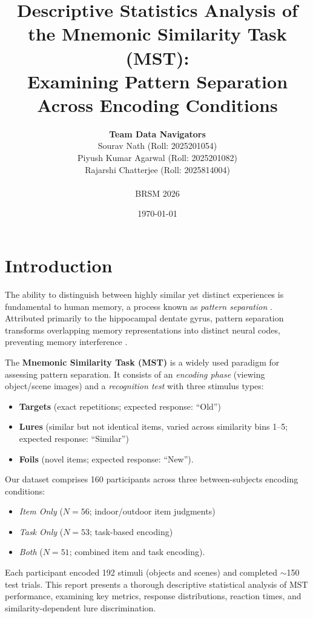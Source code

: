 \documentclass[12pt]{article}
\title{\textbf{Descriptive Statistics Analysis of the Mnemonic Similarity Task (MST):\\Examining Pattern Separation Across Encoding Conditions}}
\author{\textbf{Team Data Navigators} \\
Sourav Nath (Roll: 2025201054) \\
Piyush Kumar Agarwal (Roll: 2025201082) \\
Rajarshi Chatterjee (Roll: 2025814004) \\\\
BRSM 2026}
\date{\today}
\begin{document}
\maketitle

\section{Introduction}

The ability to distinguish between highly similar yet distinct experiences is fundamental to human memory, a process known as \textit{pattern separation} \citep{yassa2011pattern}. Attributed primarily to the hippocampal dentate gyrus, pattern separation transforms overlapping memory representations into distinct neural codes, preventing memory interference \citep{bakker2008pattern}.

The \textbf{Mnemonic Similarity Task (MST)} \citep{stark2013mnemonic} is a widely used paradigm for assessing pattern separation. It consists of an \textit{encoding phase} (viewing object/scene images) and a \textit{recognition test} with three stimulus types: 
\begin{itemize}[nosep, leftmargin=1.5em]
\item \textbf{Targets} (exact repetitions; expected response: ``Old'') 
\item \textbf{Lures} (similar but not identical items, varied across similarity bins 1--5; expected response: ``Similar'')
\item \textbf{Foils} (novel items; expected response: ``New'').
\end{itemize}
Our dataset comprises 160 participants across three between-subjects encoding conditions: 
\begin{itemize}[nosep, leftmargin=1.5em]
\item \textit{Item Only} ($N = 56$; indoor/outdoor item judgments)
\item \textit{Task Only} ($N = 53$; task-based encoding)
\item \textit{Both} ($N = 51$; combined item and task encoding). 
\end{itemize}
Each participant encoded 192 stimuli (objects and scenes) and completed $\sim$150 test trials. This report presents a thorough descriptive statistical analysis of MST performance, examining key metrics, response distributions, reaction times, and similarity-dependent lure discrimination.
\end{document}
